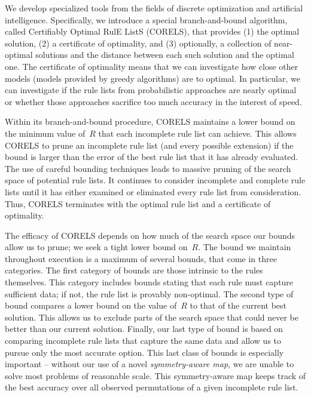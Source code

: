 We develop specialized tools from the fields of discrete optimization and artificial intelligence.
%
Specifically, we introduce a special branch-and-bound algorithm,
called Certifiably Optimal RulE ListS (CORELS), that provides
(1) the optimal solution, (2) a certificate of optimality, and (3) optionally,
a collection of near-optimal solutions and the distance between each
such solution and the optimal one.
%
The certificate of optimality means that we can investigate how close other models
(\eg models provided by greedy algorithms) are to optimal.
%
In particular, we can investigate if the rule lists from probabilistic approaches
are nearly optimal or whether those approaches sacrifice too much accuracy
in the interest of speed.

\begin{arxiv}
Within its branch-and-bound procedure, CORELS maintains a lower bound on the
minimum value of~$R$ that each incomplete rule list can achieve.
%
This allows CORELS to prune an incomplete rule list (and every possible extension)
if the bound is larger than the error of the best rule list that it has already evaluated.
%
The use of careful bounding techniques leads to massive pruning of
the search space of potential rule lists.
%
It continues to consider incomplete and complete rule lists until it has either
examined or eliminated every rule list from consideration.
%
Thus, CORELS terminates with the optimal rule list %
and a certificate of optimality.
\end{arxiv}

The efficacy of CORELS depends on how much of the search space our bounds
allow us to prune; we seek a tight lower bound on~$R$.
%
The bound we maintain throughout execution is a maximum of several bounds,
that come in three categories.
%
The first category of bounds are those intrinsic to the rules themselves.
%
This category includes bounds stating that each rule must capture sufficient data;
if not, the rule list is provably non-optimal.
%
The second type of bound compares a lower bound on the value of~$R$
to that of the current best solution.
%
This allows us to exclude parts of the search space that could never be better
than our current solution.
%
Finally, our last type of bound is based on comparing incomplete rule lists that
capture the same data and allow us to pursue only the most accurate option.
%
This last class of bounds is especially important -- without our use of a novel
\textit{symmetry-aware map}, we are unable to solve most problems of reasonable scale.
%
This symmetry-aware map keeps track of the best accuracy
over all observed permutations of a given incomplete rule list.

